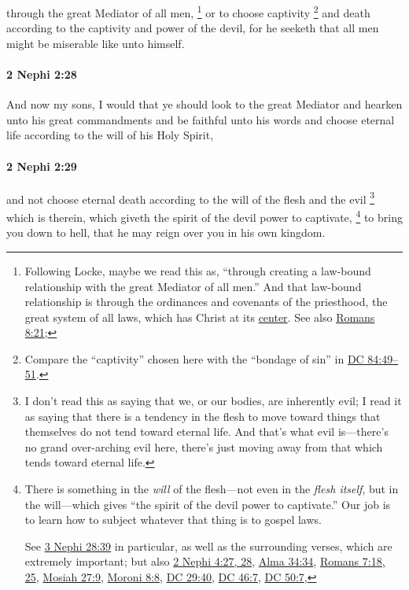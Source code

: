 			through the great Mediator of all men,%
				\footnote{%
					\label{2NEPHI-2-27-through}%
					Following Locke, maybe we read this as, ``through creating a law-bound relationship with the great Mediator of all men.'' And that law-bound relationship is through the ordinances and covenants of the priesthood, the great system of all laws, which has Christ at its \hyperref[DC107-3]{center}. See also \hyperref[ROMANS-8-21]{Romans 8:21}; 
					}
			or to choose captivity%
				\footnote{%
					Compare the ``captivity'' chosen here with the ``bondage of sin'' in \hyperref[DC84-49]{DC 84:49--51}.
					} 
			and death
			according to the captivity and power of the devil,
			for he seeketh that all men might be miserable like unto himself.

		\paragraph{2 Nephi 2:28} %
			\label{2NEPHI-2-28}

			And now my sons,
			I would that ye should look to the great Mediator
			and hearken unto his great commandments
			and be faithful unto his words
			and choose eternal life according to the will of his Holy Spirit,

		\paragraph{2 Nephi 2:29} %
			\label{2NEPHI-2-29}

			and not choose eternal death according to the will of the flesh
			and the evil%
				\footnote{%
					\label{2NEPHI-2-29-evil}%
					I don't read this as saying that we, or our bodies, are inherently evil; I read it as saying that there is a tendency in the flesh to move toward things that themselves do not tend toward eternal life. And that's what evil is---there's no grand over-arching evil here, there's just moving away from that which tends toward eternal life.
					}
			which is therein,
			which giveth the spirit of the devil power to captivate,%
				\footnote{%
					\label{2NEPHI-2-29-captivate}%
					There is something in the \textit{will} of the flesh---not even in the \textit{flesh itself}, but in the will---which gives ``the spirit of the devil power to captivate.'' Our job is to learn how to subject whatever that thing is to gospel laws.
					
					See \hyperref[3NEPHI-28-39]{3 Nephi 28:39} in particular, as well as the surrounding verses, which are extremely important; but also \hyperref[2NEPHI-4-27]{2 Nephi 4:27, 28}, \hyperref[ALMA-34-34]{Alma 34:34}, \hyperref[ROMANS-7-18]{Romans 7:18, 25}, \hyperref[MOSIAH-27-9]{Mosiah 27:9}, \hyperref[MORONI-8-8]{Moroni 8:8}, \hyperref[DC29-40]{DC 29:40}, \hyperref[DC46-7]{DC 46:7}, \hyperref[DC50-7]{DC 50:7},
					}
			to bring you down to hell,
			that he may reign over you in his own kingdom.

